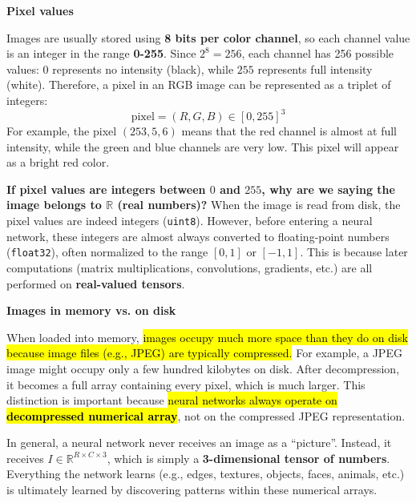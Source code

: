 \highspace
\begin{flushleft}
    \textcolor{Green3}{ \textbf{Pixel values}}
\end{flushleft}
Images are usually stored using \textbf{8 bits per color channel}, so each channel value is an integer in the range \textbf{0-255}. Since $2^{8} = 256$, each channel has 256 possible values: $0$ represents no intensity (black), while $255$ represents full intensity (white). Therefore, a pixel in an RGB image can be represented as a triplet of integers:
\begin{equation*}
    \text{pixel} = \left(R, G, B\right) \in \left[0, 255\right]^{3}
\end{equation*}
For example, the pixel $\left(253, 5, 6\right)$ means that the red channel is almost at full intensity, while the green and blue channels are very low. This pixel will appear as a bright red color.

\highspace
\textcolor{Green3}{ \textbf{If pixel values are integers between $0$ and $255$, why are we saying the image belongs to $\mathbb{R}$ (real numbers)?}} When the image is read from disk, the pixel values are indeed integers (\texttt{uint8}). However, before entering a neural network, these integers are almost always converted to floating-point numbers (\texttt{float32}), often normalized to the range $[0, 1]$ or $[-1, 1]$. This is because later computations (matrix multiplications, convolutions, gradients, etc.) are all performed on \textbf{real-valued tensors}.

\highspace
\begin{flushleft}
    \textcolor{DarkOrange3}{ \textbf{Images in memory vs. on disk}}
\end{flushleft}
When loaded into memory, \hl{images occupy much more space than they do on disk because image files (e.g., JPEG) are typically compressed.} For example, a JPEG image might occupy only a few hundred kilobytes on disk. After decompression, it becomes a full array containing every pixel, which is much larger. This distinction is important because \hl{neural networks always operate on \textbf{decompressed numerical array}}, not on the compressed JPEG representation.

\highspace
In general, a neural network never receives an image as a ``picture''. Instead, it receives $I \in \mathbb{R}^{R \times C \times 3}$, which is simply a \textbf{3-dimensional tensor of numbers}. Everything the network learns (e.g., edges, textures, objects, faces, animals, etc.) is ultimately learned by discovering patterns within these numerical arrays.